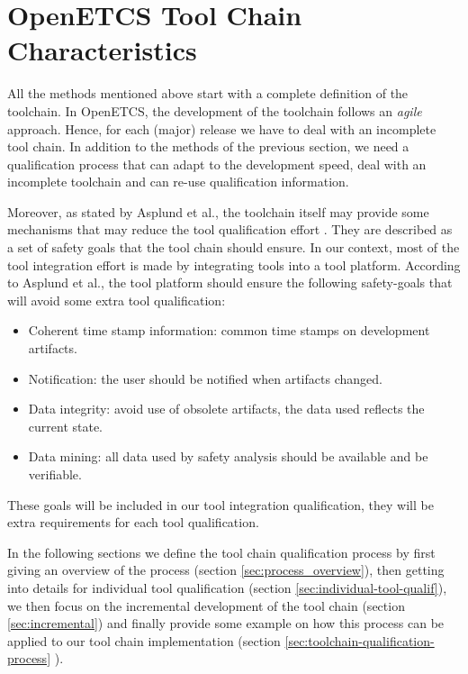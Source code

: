 \section{OpenETCS Tool Chain Characteristics}
\label{sec:toolchain-analysis}

All the methods mentioned above start with a complete definition of the toolchain. In OpenETCS, the development of the toolchain follows an \emph{agile} approach.
Hence, for each (major) release we have to deal with an incomplete tool
chain. In addition to the methods of the previous section,  we need a qualification
process that can adapt to the development speed, deal with an incomplete toolchain
and can re-use qualification information.


Moreover, as stated by Asplund et al., the toolchain itself may
provide some mechanisms that may reduce the tool qualification effort
\cite{asplund_towards_2012,asplund_qualifying_2012}. They are
described as a set of safety goals that the tool chain should ensure.
 In our context, most of the
tool integration effort is made by integrating tools into a tool
platform.  According to Asplund et al., the tool platform should
ensure the following safety-goals that will avoid some extra tool qualification:
\begin{itemize}
\item Coherent time stamp information: common time stamps on development artifacts.
\item Notification: the user should be notified when artifacts changed.
\item Data integrity:  avoid use of obsolete artifacts, the data used reflects the
  current state.
\item Data mining: all data used by safety analysis should be available and be
  verifiable.
\end{itemize}

These goals will be included in our tool integration
qualification, they will be extra requirements for each tool qualification.

In the following sections we define the tool chain qualification
process by first giving an overview of the process (section
\ref{sec:process_overview}), then getting into details for individual
tool qualification (section \ref{sec:individual-tool-qualif}), we then
focus on the incremental development of the tool chain (section
\ref{sec:incremental}) and finally provide some example on how this process can be applied to our tool
chain implementation (section \ref{sec:toolchain-qualification-process} ).

